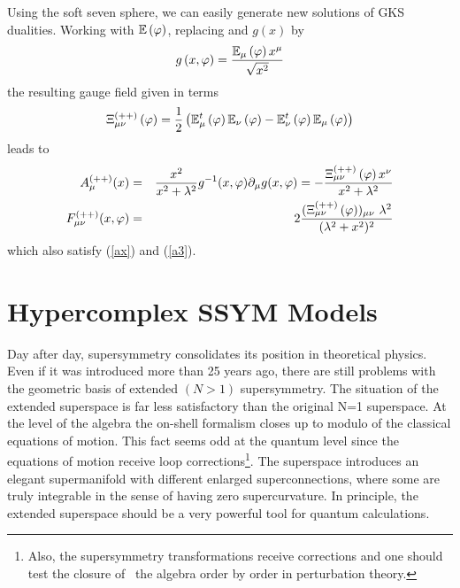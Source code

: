 \documentclass[a4paper,12pt]{book}
\begin{document}
Using the soft seven sphere, we can easily generate new solutions of GKS
dualities. Working with $\Bbb{E}\left( \varphi \right) $, replacing and $%
g\left( x\right) $ by 
\begin{equation}
g\left( x,\varphi \right) =\frac{\Bbb{E}_{\mu }\left( \varphi \right) x^{\mu
}}{\sqrt{x^{2}}}
\end{equation}
the resulting gauge field given in terms 
\begin{equation}
\Xi _{\mu \nu }^{\left( ++\right) }\left( \varphi \right) =\frac{1}{2}\left( 
\Bbb{E}_{\mu }^{t}\left( \varphi \right) \Bbb{E}_{\nu }\left( \varphi
\right) -\Bbb{E}_{\nu }^{t}\left( \varphi \right) \Bbb{E}_{\mu }\left(
\varphi \right) \right)
\end{equation}
leads to 
\begin{eqnarray}
A_{\mu }^{(++)}(x) &=&\frac{x^{2}}{x^{2}+\lambda ^{2}}g^{-1}(x,\varphi
)\partial _{\mu }g(x,\varphi )=-\frac{\Xi _{\mu \nu }^{\left( ++\right)
}\left( \varphi \right) x^{\nu }}{x^{2}+\lambda ^{2}} \\
F_{\mu \nu }^{\left( ++\right) }(x,{\varphi }) &=&2\frac{(\Xi _{\mu \nu
}^{\left( ++\right) }\left( \varphi \right) )_{\mu \nu ~}\lambda ^{2}}{%
(\lambda ^{2}+x^{2})^{2}}  \label{fff}
\end{eqnarray}
which also satisfy (\ref{ax}) and (\ref{a3}).

\chapter{Hypercomplex SSYM Models}

Day after day, supersymmetry consolidates its position in theoretical
physics. Even if it was introduced more than 25 years ago, there are still
problems with the geometric basis of extended $\left( N>1\right) $
supersymmetry. The situation of the extended superspace is far less
satisfactory than the original N=1 superspace. At the level of the algebra
the on-shell formalism closes up to modulo of the classical equations of
motion. This fact seems odd at the quantum level since the equations of
motion receive loop corrections\footnote{%
Also, the supersymmetry transformations receive corrections and one should
test the closure of \ the algebra order by order in perturbation theory.}.
The superspace introduces an elegant supermanifold with different enlarged
superconnections, where some are truly integrable in the sense of having
zero supercurvature. In principle, the extended superspace should be a very
powerful tool for quantum calculations.
\end{document}
